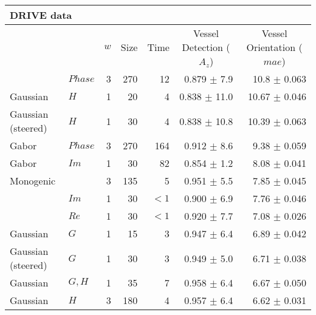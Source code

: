 \begin{tabularx}{\linewidth}{p{3cm} p{3cm} r r r r r}
\toprule
\multicolumn{7}{l}{DRIVE data} \\
\midrule
            &
            & $w$
            & Size
            & Time
            & \multicolumn{1}{c}{Vessel Detection \linebreak ($A_z$)}
            & \multicolumn{1}{c}{Vessel Orientation \linebreak ($mae$)}  \\

\dtcwt{}& $Phase$                   & 3 &    270    & 12     & 0.879 $\pm$ 7.9  & 10.8 $\pm$  0.063 \\

Gaussian& $H$                       & 1 &     20    &  4     & 0.838 $\pm$ 11.0 & 10.67 $\pm$ 0.046  \\

Gaussian (steered)& $H$             & 1 &     30    &  4     & 0.838 $\pm$ 10.8 & 10.39 $\pm$ 0.063\\

Gabor   & $Phase$                   & 3 &    270    &164     & 0.912 $\pm$ 8.6  & 9.38 $\pm$  0.059 \\

Gabor   & $Im$                      & 1 &     30    & 82     & 0.854 $\pm$ 1.2  & 8.08 $\pm$ 0.041  \\

\multicolumn{2}{l}{Monogenic}       & 3 &    135    &  5     & 0.951 $\pm$ 5.5  & 7.85 $\pm$ 0.045 \\

\dtcwt{}& $Im$                      & 1 &     30    &${<}1$  & 0.900 $\pm$ 6.9  & 7.76 $\pm$ 0.046 \\

\dtcwt{}& $Re$                      & 1 &     30    &${<}1$  & 0.920 $\pm$ 7.7  & 7.08 $\pm$ 0.026  \\

Gaussian& $G$                       & 1 &     15    &  3     & 0.947 $\pm$ 6.4  & 6.89 $\pm$ 0.042   \\

Gaussian (steered)& $G$             & 1 &     30    &  3     & 0.949 $\pm$ 5.0  & 6.71 $\pm$ 0.038 \\

Gaussian& $G, H$                    & 1 &     35    &  7     & 0.958 $\pm$ 6.4  & 6.67 $\pm$ 0.050   \\

Gaussian& $H$                       & 3 &    180    &  4     & 0.957 $\pm$ 6.4  & 6.62 $\pm$ 0.031 \\


\end{tabularx}
